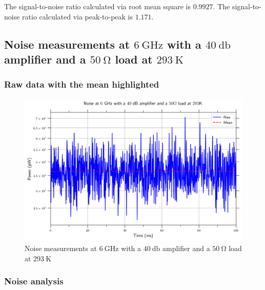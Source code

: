 \documentclass[english,12pt,a4paper]{article}
\begin{document}
	The signal-to-noise ratio calculated via root mean square is $0.9927$.
	The signal-to-noise ratio calculated via peak-to-peak is $1.171$.


\hypertarget{noise-measurements-at-6-ghz-with-a-40-db-amplifier-and-a-50-omega-load-at-293k}{%
	\subsection{Noise measurements at $\qty{6}{\giga\hertz}$ with a $\qty{40}{\decibel}$ amplifier and a $\qty{50}{\ohm}$ load at $\qty{293}{\kelvin}$}\label{noise-measurements-at-6-ghz-with-a-40-db-amplifier-and-a-50-omega-load-at-293k}}

 

\hypertarget{raw-data-with-the-mean-highlighted}{%
	\subsubsection{Raw data with the mean
		highlighted}\label{raw-data-with-the-mean-highlighted_3}}

\begin{figure}[H]
	\includegraphics[width=1\linewidth]{Plots/noise_floor_6_GHz_amplif_50ohm_rt}
	\caption{Noise measurements at $\qty{6}{\giga\hertz}$ with a $\qty{40}{\decibel}$ amplifier and a $\qty{50}{\ohm}$ load at $\qty{293}{\kelvin}$}
	\label{fig:noisefloor6ghzamplif50ohmrt}
\end{figure}


\hypertarget{noise-analysis}{%
	\subsubsection{Noise analysis}\label{noise-analysis_4}}
\end{document}
